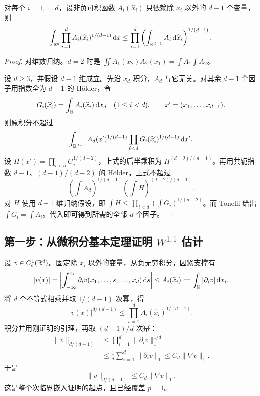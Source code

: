 \begin{lemma}[坐标乘积积分估计]\label{lem:sobolev-coordinate}
对每个 $i=1,\ldots,d$，设非负可积函数 $A_i(\widehat x_i)$ 只依赖除 $x_i$ 以外的 $d-1$ 个变量，则
\begin{equation}
 \int_{\mathbb R^d}\prod_{i=1}^d A_i(\widehat x_i)^{1/(d-1)}\,\mathrm d x
 \le\prod_{i=1}^d
       \left(\int_{\mathbb R^{d-1}}A_i\,\mathrm d\widehat x_i\right)^{1/(d-1)}.
 \label{eq:sobolev-coordinate}
\end{equation}
\end{lemma}
\begin{proof}
对维数归纳。$d=2$ 时是 $\iint A_1(x_2)A_2(x_1)=\int A_1\int A_2$。

设 $d\ge3$，并假设 $d-1$ 维成立。先沿 $x_d$ 积分，$A_d$ 与它无关。对其余 $d-1$ 个因子用指数全为 $d-1$ 的 H\"older，令
\[
 G_i(\widehat x_i')=\int_\mathbb R A_i(\widehat x_i)\,\mathrm d x_d
 \quad(1\le i<d),\qquad x'=(x_1,\ldots,x_{d-1}).
\]
则原积分不超过
\[
 \int_{\mathbb R^{d-1}} A_d(x')^{1/(d-1)}
                \prod_{i<d}G_i(\widehat x_i')^{1/(d-1)}\,\mathrm d x'.
\]
设 $H(x')=\prod_{i<d}G_i^{1/(d-2)}$，上式的后半乘积为 $H^{(d-2)/(d-1)}$。再用共轭指数 $d-1$、$(d-1)/(d-2)$ 的 H\"older，上式不超过
\[
 \left(\int A_d\right)^{1/(d-1)}
 \left(\int H\right)^{(d-2)/(d-1)}.
\]
对 $H$ 使用 $d-1$ 维归纳假设，即 $\int H\le\prod_{i<d}(\int G_i)^{1/(d-2)}$。而 Tonelli 给出 $\int G_i=\int A_i$。代入即可得到所需的全部 $d$ 个因子。
\end{proof}

\subsection{第一步：从微积分基本定理证明 \texorpdfstring{$W^{1,1}$}{W11} 估计}

设 $v\in C_c^1(\mathbb R^d)$。固定除 $x_i$ 以外的变量，从负无穷积分，因紧支撑有
\[
 |v(x)|=\left|\int_{-\infty}^{x_i}\partial_i v(x_1,\ldots,s,\ldots,x_d)\,\mathrm d s\right|
 \le A_i(\widehat x_i):=\int_\mathbb R|\partial_i v|\,\mathrm d x_i.
\]
将 $d$ 个不等式相乘并取 $1/(d-1)$ 次幂，得
\[
 |v(x)|^{d/(d-1)}\le\prod_{i=1}^d A_i(\widehat x_i)^{1/(d-1)}.
\]
积分并用刚证明的引理，再取 $(d-1)/d$ 次幂：
\begin{align*}
 \|v\|_{d/(d-1)}
 &\le\prod_{i=1}^d\|\partial_i v\|_1^{1/d}\\
 &\le\frac1d\sum_{i=1}^d\|\partial_i v\|_1
 \le C_d\|\nabla v\|_1.
\end{align*}
于是
\begin{equation}
 \boxed{\|v\|_{d/(d-1)}\le C_d\|\nabla v\|_1.}
 \label{eq:sobolev-w11}
\end{equation}
这是整个次临界嵌入证明的起点，且已经覆盖 $p=1$。

